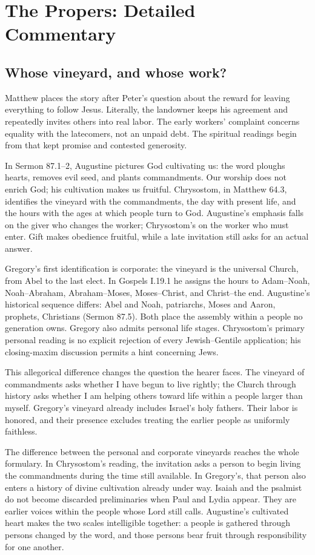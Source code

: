 \section*{The Propers: Detailed Commentary}
\subsection{Whose vineyard, and whose work?}
Matthew places the story after Peter's question about the reward for leaving everything to follow Jesus. Literally, the landowner keeps his agreement and repeatedly invites others into real labor. The early workers' complaint concerns equality with the latecomers, not an unpaid debt. The spiritual readings begin from that kept promise and contested generosity.

In Sermon 87.1--2, Augustine pictures God cultivating us: the word ploughs hearts, removes evil seed, and plants commandments. Our worship does not enrich God; his cultivation makes us fruitful. Chrysostom, in Matthew 64.3, identifies the vineyard with the commandments, the day with present life, and the hours with the ages at which people turn to God. Augustine's emphasis falls on the giver who changes the worker; Chrysostom's on the worker who must enter. Gift makes obedience fruitful, while a late invitation still asks for an actual answer.

Gregory's first identification is corporate: the vineyard is the universal Church, from Abel to the last elect. In Gospels I.19.1 he assigns the hours to Adam--Noah, Noah--Abraham, Abraham--Moses, Moses--Christ, and Christ--the end. Augustine's historical sequence differs: Abel and Noah, patriarchs, Moses and Aaron, prophets, Christians (Sermon 87.5). Both place the assembly within a people no generation owns. Gregory also admits personal life stages. Chrysostom's primary personal reading is no explicit rejection of every Jewish--Gentile application; his closing-maxim discussion permits a hint concerning Jews.

This allegorical difference changes the question the hearer faces. The vineyard of commandments asks whether I have begun to live rightly; the Church through history asks whether I am helping others toward life within a people larger than myself. Gregory's vineyard already includes Israel's holy fathers. Their labor is honored, and their presence excludes treating the earlier people as uniformly faithless.

The difference between the personal and corporate vineyards reaches the whole formulary. In Chrysostom's reading, the invitation asks a person to begin living the commandments during the time still available. In Gregory's, that person also enters a history of divine cultivation already under way. Isaiah and the psalmist do not become discarded preliminaries when Paul and Lydia appear. They are earlier voices within the people whose Lord still calls. Augustine's cultivated heart makes the two scales intelligible together: a people is gathered through persons changed by the word, and those persons bear fruit through responsibility for one another.

